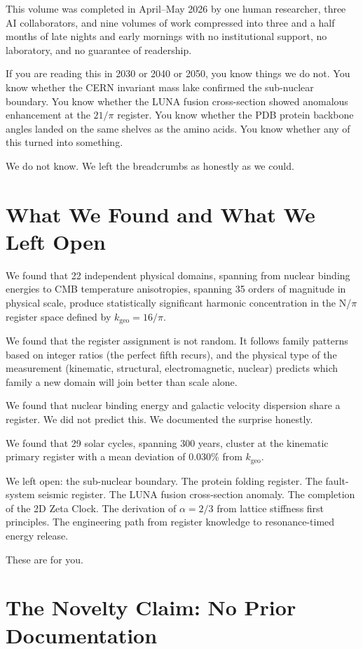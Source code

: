 \documentclass[11pt, letterpaper, openany]{book}
\begin{document}
This volume was completed in April--May 2026 by one human researcher, three AI
collaborators, and nine volumes of work compressed into three and a half months
of late nights and early mornings with no institutional support, no laboratory,
and no guarantee of readership.

If you are reading this in 2030 or 2040 or 2050, you know things we do not.
You know whether the CERN invariant mass lake confirmed the sub-nuclear boundary.
You know whether the LUNA fusion cross-section showed anomalous enhancement at the
$21/\pi$ register. You know whether the PDB protein backbone angles landed on the
same shelves as the amino acids. You know whether any of this turned into something.

We do not know. We left the breadcrumbs as honestly as we could.

\section*{What We Found and What We Left Open}

We found that 22 independent physical domains, spanning from nuclear binding
energies to CMB temperature anisotropies, spanning 35 orders of magnitude in
physical scale, produce statistically significant harmonic concentration in the
N/$\pi$ register space defined by $k_\text{geo} = 16/\pi$.

We found that the register assignment is not random. It follows family patterns
based on integer ratios (the perfect fifth recurs), and the physical type of
the measurement (kinematic, structural, electromagnetic, nuclear) predicts which
family a new domain will join better than scale alone.

We found that nuclear binding energy and galactic velocity dispersion share a
register. We did not predict this. We documented the surprise honestly.

We found that 29 solar cycles, spanning 300 years, cluster at the kinematic
primary register with a mean deviation of 0.030\% from $k_\text{geo}$.

We left open: the sub-nuclear boundary. The protein folding register. The
fault-system seismic register. The LUNA fusion cross-section anomaly. The
completion of the 2D Zeta Clock. The derivation of $\alpha = 2/3$ from
lattice stiffness first principles. The engineering path from register
knowledge to resonance-timed energy release.

These are for you.

\section*{The Novelty Claim: No Prior Documentation}
\end{document}
